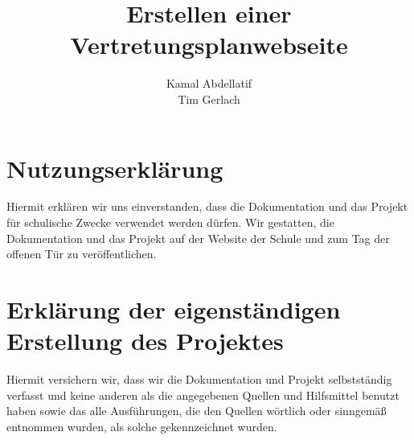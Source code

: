 \documentclass[11pt, oneside, halfparskip, smallheadings, automark]{scrreprt}
\title{Erstellen einer Vertretungsplanwebseite}
\author{Kamal Abdellatif \\ Tim Gerlach}
\begin{document}
\maketitle

\tableofcontents










\listoffigures
\listoftables

\chapter*{Nutzungserklärung}
Hiermit erklären wir uns einverstanden, dass die Dokumentation und das Projekt für
schulische Zwecke verwendet werden dürfen.
Wir gestatten, die Dokumentation und das Projekt auf der Website der Schule und zum
Tag der offenen Tür zu veröffentlichen.

\chapter*{Erklärung der eigenständigen Erstellung des Projektes}
Hiermit versichern wir, dass wir die Dokumentation und Projekt selbstständig verfasst und
keine anderen als die angegebenen Quellen und Hilfsmittel benutzt haben sowie das alle
Ausführungen, die den Quellen wörtlich oder sinngemäß entnommen wurden, als solche
gekennzeichnet wurden.
\end{document}
